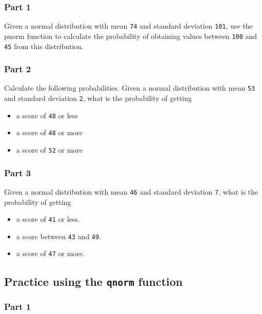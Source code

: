 \documentclass[12pt,]{krantz}
\providecommand{\tightlist}{%
  \setlength{\itemsep}{0pt}\setlength{\parskip}{0pt}}
\theoremstyle{definition}
\theoremstyle{definition}
\theoremstyle{definition}
\theoremstyle{remark}
\begin{document}
\subsubsection{Part 1}\label{part-1}

Given a normal distribution with mean \texttt{74} and standard deviation
\texttt{101}, use the pnorm function to calculate the probability of
obtaining values between \texttt{100} and \texttt{45} from this
distribution.

\subsubsection{Part 2}\label{part-2}

Calculate the following probabilities. Given a normal distribution with
mean \texttt{53} and standard deviation \texttt{2}, what is the
probability of getting

\begin{itemize}
\tightlist
\item
  a score of \texttt{48} or less
\item
  a score of \texttt{48} or more
\item
  a score of \texttt{52} or more
\end{itemize}

\subsubsection{Part 3}\label{part-3}

Given a normal distribution with mean \texttt{46} and standard deviation
\texttt{7}, what is the probability of getting

\begin{itemize}
\tightlist
\item
  a score of \texttt{41} or less.
\item
  a score between \texttt{43} and \texttt{49}.
\item
  a score of \texttt{47} or more.
\end{itemize}

\subsection{\texorpdfstring{Practice using the \texttt{qnorm}
function}{Practice using the qnorm function}}\label{practice-using-the-qnorm-function}

\subsubsection{Part 1}\label{part-1-1}
\end{document}
